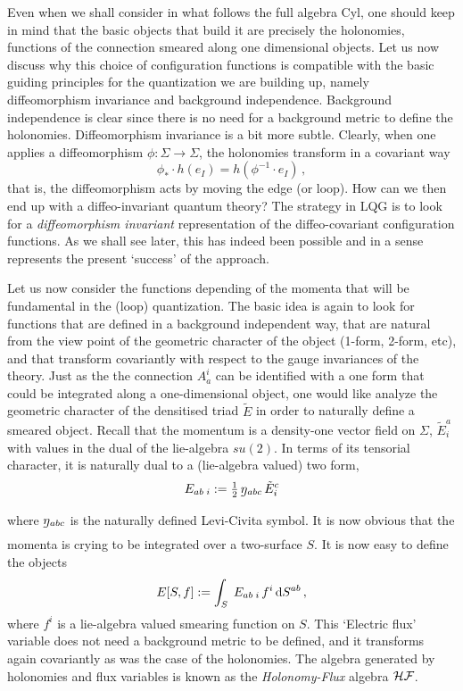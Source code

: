 \documentclass[aps,prd,tightenlines,showpacs,nofootinbib,preprint]{revtex4}
\def\be{\begin{equation}}
\def\ee{\end{equation}}
\def\tE{\tilde{E}}
\def\half{{\textstyle{1\over2}}}
\def\d{{\rm d}}
\newcommand{\teta}{\rlap{\lower2ex\hbox{$\,\tilde{}$}}\eta{}}
\begin{document}
Even when we shall consider in what follows the full algebra Cyl,
one should keep in mind that the basic objects that build it are
precisely the holonomies, functions of the connection smeared
along one dimensional objects. Let us now discuss why this choice
of configuration functions is compatible with the basic guiding
principles for the quantization we are building up, namely
diffeomorphism invariance and background independence. Background
independence is clear since there is no need for a background
metric to define the holonomies. Diffeomorphism invariance is a
bit more subtle. Clearly, when one applies a diffeomorphism
$\phi:\Sigma\rightarrow \Sigma$, the holonomies transform in a
covariant way
%
\be
  \phi_* \cdot h(e_I)=h(\phi^{-1}\cdot e_I)\, ,
\ee
%
that is, the diffeomorphism acts by moving the edge (or loop). How
can we then end up with a diffeo-invariant quantum theory? The
strategy in LQG is to look for a {\it diffeomorphism invariant}
representation of the diffeo-covariant configuration functions. As
we shall see later, this has indeed been possible and in a sense
represents the present `success' of the approach.

Let us now consider the functions depending of the momenta that
will be fundamental in the (loop) quantization. The basic idea is
again to look for functions that are defined in a background
independent way, that are natural from the view point of the
geometric character of the object (1-form, 2-form, etc), and that
transform covariantly with respect to the gauge invariances of the
theory. Just as the the connection $A_a^i$ can be identified with
a one form that could be integrated along a one-dimensional
object, one would like analyze the geometric character of the
densitised triad $\tE$ in order to naturally define a smeared
object. Recall that the momentum is a density-one vector field on
$\Sigma$, $\tE^a_i$ with values in the dual of the lie-algebra
$su(2)$. In terms of its tensorial character, it is naturally dual
to a (lie-algebra valued) two form,
%
\be
 E_{ab\;i}:=\half\, \teta_{abc}\,\tE^c_i
\ee
%
where $\teta_{abc}$ is the naturally defined Levi-Civita symbol.
It is now obvious that the momenta is crying to be integrated over
a two-surface $S$. It is now easy to define the objects
%
\be
 E[S,f]:=\int_S \;E_{ab\;i}\,f^i\,\d S^{ab}\, ,
\ee
%
where $f^i$ is a lie-algebra valued smearing function on $S$. This
`Electric flux' variable does not need a background metric to be
defined, and it transforms again covariantly as was the case of
the holonomies. The algebra generated by holonomies and flux
variables is known as the {\it Holonomy-Flux} algebra ${\cal HF}$.
\end{document}
